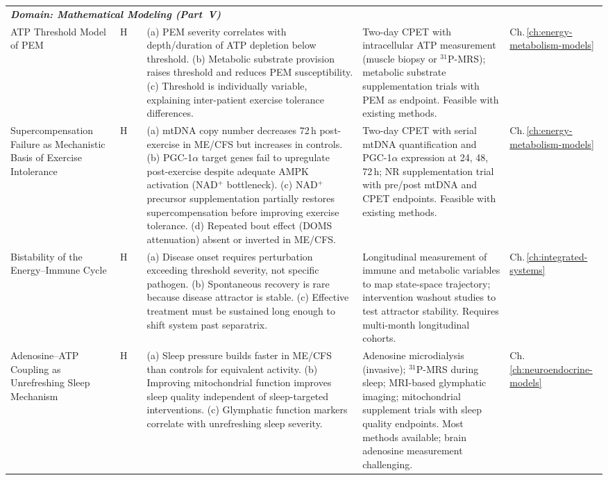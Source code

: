 \begin{longtable}{%
  p{3.0cm}
  >{\centering\arraybackslash}p{0.55cm}
  >{\centering\arraybackslash}p{1.0cm}
  p{3.8cm}
  p{3.8cm}
  p{2.2cm}
}
\multicolumn{6}{l}{\small\textit{\textbf{Domain: Mathematical Modeling (Part~V)}}} \\[2pt]

ATP Threshold Model of PEM
&
H & 0.45
&
(a) PEM severity correlates with depth/duration of ATP depletion below threshold.
(b) Metabolic substrate provision raises threshold and reduces PEM susceptibility.
(c) Threshold is individually variable, explaining inter-patient exercise tolerance differences.
&
Two-day CPET with intracellular ATP measurement (muscle biopsy or $^{31}$P-MRS);
metabolic substrate supplementation trials with PEM as endpoint.
Feasible with existing methods.
&
Ch.\,\ref{ch:energy-metabolism-models} \\[6pt]

Supercompensation Failure as Mechanistic Basis of Exercise Intolerance
&
H & 0.50
&
(a) mtDNA copy number decreases 72\,h post-exercise in ME/CFS but increases in controls.
(b) PGC-1$\alpha$ target genes fail to upregulate post-exercise despite adequate AMPK activation (NAD$^+$ bottleneck).
(c) NAD$^+$ precursor supplementation partially restores supercompensation before improving exercise tolerance.
(d) Repeated bout effect (DOMS attenuation) absent or inverted in ME/CFS.
&
Two-day CPET with serial mtDNA quantification and PGC-1$\alpha$ expression at 24, 48, 72\,h;
NR supplementation trial with pre/post mtDNA and CPET endpoints.
Feasible with existing methods.
&
Ch.\,\ref{ch:energy-metabolism-models} \\[6pt]

Bistability of the Energy--Immune Cycle
&
H & 0.50
&
(a) Disease onset requires perturbation exceeding threshold severity, not specific pathogen.
(b) Spontaneous recovery is rare because disease attractor is stable.
(c) Effective treatment must be sustained long enough to shift system past separatrix.
&
Longitudinal measurement of immune and metabolic variables to map state-space trajectory;
intervention washout studies to test attractor stability.
Requires multi-month longitudinal cohorts.
&
Ch.\,\ref{ch:integrated-systems} \\[6pt]

Adenosine--ATP Coupling as Unrefreshing Sleep Mechanism
&
H & 0.35
&
(a) Sleep pressure builds faster in ME/CFS than controls for equivalent activity.
(b) Improving mitochondrial function improves sleep quality independent of sleep-targeted interventions.
(c) Glymphatic function markers correlate with unrefreshing sleep severity.
&
Adenosine microdialysis (invasive); $^{31}$P-MRS during sleep;
MRI-based glymphatic imaging; mitochondrial supplement trials with sleep quality endpoints.
Most methods available; brain adenosine measurement challenging.
&
Ch.\,\ref{ch:neuroendocrine-models} \\[6pt]


\end{longtable}
